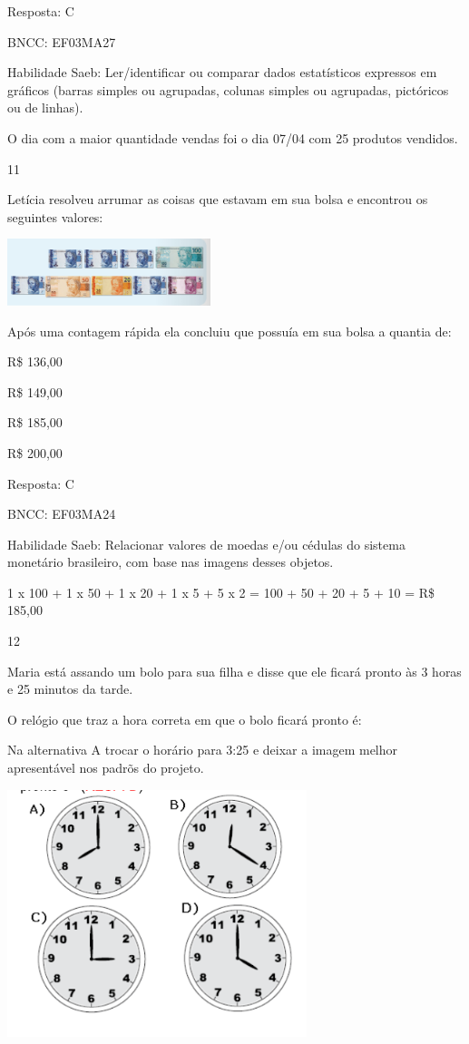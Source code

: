 \begin{escolha}
\begin{escolha}
Resposta: C

BNCC: EF03MA27

Habilidade Saeb: Ler/identificar ou comparar dados estatísticos
expressos em gráficos (barras simples ou agrupadas, colunas simples ou
agrupadas, pictóricos ou de linhas).

O dia com a maior quantidade vendas foi o dia 07/04 com 25 produtos
vendidos.

\num{11}

Letícia resolveu arrumar as coisas que estavam em sua bolsa e encontrou
os seguintes valores:

\includegraphics[width=2.33354in,height=0.76673in]{media/image125.png}

Após uma contagem rápida ela concluiu que possuía em sua bolsa a quantia
de:

\begin{escolha}

\item
  R\$ 136,00
\item
  R\$ 149,00
\item
  R\$ 185,00
\item
  R\$ 200,00
\end{escolha}

Resposta: C

BNCC: EF03MA24

Habilidade Saeb: Relacionar valores de moedas e/ou cédulas do sistema
monetário brasileiro, com base nas imagens desses objetos.

1 x 100 + 1 x 50 + 1 x 20 + 1 x 5 + 5 x 2 = 100 + 50 + 20 + 5 + 10 = R\$
185,00

\num{12}

Maria está assando um bolo para sua filha e disse que ele ficará pronto
às 3 horas e 25 minutos da tarde.

O relógio que traz a hora correta em que o bolo ficará pronto é:

Na alternativa A trocar o horário para 3:25 e deixar a imagem melhor
apresentável nos padrõs do projeto.

\includegraphics[width=3.44197in,height=2.84191in]{media/image126.png}


\end{escolha}
\end{escolha}
